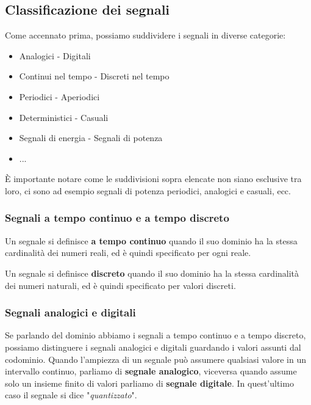 \documentclass[a4paper, titlepage]{article}
\begin{document}
\subsection{Classificazione dei segnali}
Come accennato prima, possiamo suddividere i segnali in diverse categorie:
\begin{itemize}
	\item Analogici - Digitali
	\item Continui nel tempo - Discreti nel tempo
	\item Periodici - Aperiodici
	\item Deterministici - Casuali
	\item Segnali di energia - Segnali di potenza
	\item ...
\end{itemize}
È importante notare come le suddivisioni sopra elencate non siano esclusive tra loro, ci sono ad esempio segnali di potenza periodici, analogici e casuali, ecc.

\subsubsection{Segnali a tempo continuo e a tempo discreto}
Un segnale si definisce \textbf{a tempo continuo} quando il suo dominio ha la stessa cardinalità dei numeri reali, ed è quindi specificato per ogni reale.


Un segnale si definisce \textbf{discreto} quando il suo dominio ha la stessa cardinalità dei numeri naturali, ed è quindi specificato per valori discreti.


\subsubsection{Segnali analogici e digitali}
Se parlando del dominio abbiamo i segnali a tempo continuo e a tempo discreto, possiamo distinguere i segnali analogici e digitali guardando i valori assunti dal codominio.
Quando l'ampiezza di un segnale può assumere qualsiasi valore in un intervallo continuo, parliamo di \textbf{segnale analogico}, viceversa quando assume solo un insieme
finito di valori parliamo di \textbf{segnale digitale}. In quest'ultimo caso il segnale si dice "\textit{quantizzato}".
\end{document}
